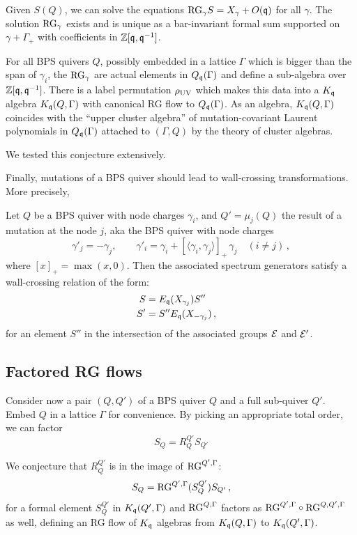 \documentclass[12pt]{amsart}
\begin{document}
Given $S(Q)$, we can solve the equations $\mathrm{RG}_\gamma S = X_\gamma + O(\mathfrak{q})$ for all $\gamma$. The solution $\mathrm{RG}_\gamma$ exists and is unique as a bar-invariant formal sum supported on $\gamma + \Gamma_+$ with coefficients in $\mathbb{Z}[\mathfrak{q}, \mathfrak{q}^{-1}]$. 
\begin{conjecture}\label{conj:upper}
	For all BPS quivers $Q$, possibly embedded in a lattice $\Gamma$ which is bigger than the span of $\gamma_i$, 
	the $\mathrm{RG}_\gamma$ are actual elements in $Q_{\mathfrak{q}}(\Gamma)$ and define a sub-algebra over $\mathbb{Z}[\mathfrak{q}, \mathfrak{q}^{-1}]$. There is a label permutation 
	$\rho_{\mathrm{UV}}$ which makes this data into a $K_{\mathfrak{q}}$ algebra $K_{\mathfrak{q}}(Q,\Gamma)$ with canonical RG flow to $Q_{\mathfrak{q}}(\Gamma)$.
	As an algebra, $K_{\mathfrak{q}}(Q,\Gamma)$ coincides with the ``upper cluster algebra'' of mutation-covariant Laurent polynomials in $Q_{\mathfrak{q}}(\Gamma)$ 	attached to $(\Gamma,Q)$ by the theory of cluster algebras.
\end{conjecture}
We tested this conjecture extensively. 

Finally, mutations of a BPS quiver should lead to wall-crossing transformations. More precisely, 
\begin{conjecture}[$S$ Mutation]\label{conj:mut} Let $Q$ be a BPS quiver with node charges $\gamma_i$, and $Q'=\mu_j(Q)$ the result of a mutation at the node $j$, aka the BPS quiver 
with node charges
\begin{equation}\label{eq:mut-charges}
	\gamma'_j = -\gamma_j , \qquad
	\gamma'_i = \gamma_i + [\langle \gamma_i, \gamma_j \rangle]_+ \, \gamma_j \quad (i \neq j) \, ,
\end{equation}
where $[x]_+ = \max(x,0)$.
Then the associated spectrum generators satisfy a wall-crossing relation of the form:
\begin{align}
	S &= E_{\mathfrak{q}}(X_{\gamma_j}) S'' \cr
	S' &= S'' E_{\mathfrak{q}}(X_{-\gamma_j}) \, ,
\end{align}
for an element $S''$ in the intersection of the associated groups $\mathcal{E}$ and $\mathcal{E}'$.
\end{conjecture}

\subsection{Factored RG flows}
Consider now a pair $(Q,Q')$ of a BPS quiver $Q$ and a full sub-quiver $Q'$. Embed $Q$ in a lattice $\Gamma$ for convenience. By picking an appropriate total order, we can factor
\begin{equation}
	S_Q = R_Q^{Q'} S_{Q'} 
\end{equation}
\begin{conjecture}\label{conj:factored}
	We conjecture that $R_Q^{Q'}$ is in the image of $\mathrm{RG}^{Q',\Gamma}$:
	\begin{equation}
	S_Q = \mathrm{RG}^{Q',\Gamma}(S_Q^{Q'}) S_{Q'} \, ,
	\end{equation}
	for a formal element $S_Q^{Q'}$ in $K_{\mathfrak{q}}(Q',\Gamma)$ and $\mathrm{RG}^{Q,\Gamma}$ factors as $\mathrm{RG}^{Q',\Gamma}\circ \mathrm{RG}^{Q,Q',\Gamma}$ as well, defining an RG flow of $K_{\mathfrak{q}}$ algebras from $K_{\mathfrak{q}}(Q,\Gamma)$ to $K_{\mathfrak{q}}(Q',\Gamma)$.
\end{conjecture}
\end{document}
